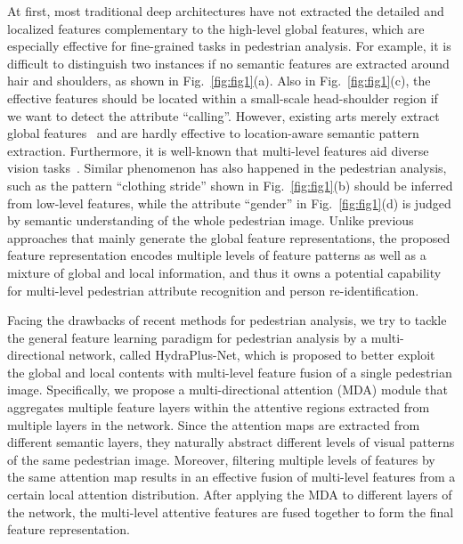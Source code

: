 \documentclass[10pt,twocolumn,letterpaper]{article}
\begin{document}
At first, most traditional deep architectures have not extracted the detailed and localized features complementary to the high-level global features, which are especially effective for fine-grained tasks in pedestrian analysis.
For example, it is difficult to distinguish two instances if no semantic features are extracted around hair and shoulders, as shown in Fig.~\ref{fig:fig1}(a).
Also in Fig.~\ref{fig:fig1}(c), the effective features should be located within a small-scale head-shoulder region if we want to detect the attribute ``calling''.
However, existing arts merely extract global features~\cite{li2015multi, sudowe2015person, xiao2016learning} and are hardly effective to location-aware semantic pattern extraction.
Furthermore, it is well-known that multi-level features aid diverse vision tasks~\cite{newell2016stacked,cornia2016deep}.
Similar phenomenon has also happened in the pedestrian analysis, such as the pattern ``clothing stride'' shown in Fig.~\ref{fig:fig1}(b) should be inferred from low-level features, while the attribute ``gender'' in Fig.~\ref{fig:fig1}(d) is judged by semantic understanding of the whole pedestrian image.
Unlike previous approaches that mainly generate the global feature representations, the proposed feature representation encodes multiple levels of feature patterns as well as a mixture of global and local information, and thus it owns a potential capability for multi-level pedestrian attribute recognition and person re-identification.



Facing the drawbacks of recent methods for pedestrian analysis, we try to tackle the general feature learning paradigm for pedestrian analysis by a multi-directional network, called HydraPlus-Net, which is proposed to better exploit the global and local contents with multi-level feature fusion of a single pedestrian image.
Specifically, we propose a multi-directional attention (MDA) module that aggregates multiple feature layers within the attentive regions extracted from multiple layers in the network.
Since the attention maps are extracted from different semantic layers, they naturally abstract different levels of visual patterns of the same pedestrian image.
Moreover, filtering multiple levels of features by the same attention map results in an effective fusion of multi-level features from a certain local attention distribution.
After applying the MDA to different layers of the network, the multi-level attentive features are fused together to form the final feature representation.
\end{document}
